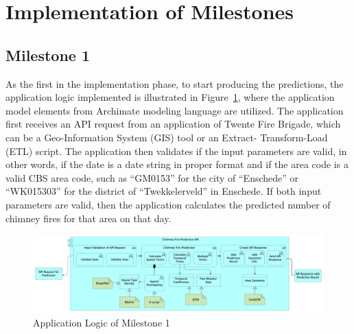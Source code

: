 \documentclass{utitcphd_overleaf}
\begin{document}






\section{Implementation of Milestones}

\subsection{Milestone 1}

As the first in the implementation phase, to start producing the predictions, the application logic implemented is illustrated in Figure~\ref{fig:m1_logic}, where the application model elements from Archimate modeling language are utilized. The application first receives an API request from an application of Twente Fire Brigade, which can be a Geo-Information System (GIS) tool or an Extract- Transform-Load (ETL) script. The application then validates if the input parameters are valid, in other words, if the date is a date string in proper format and if the area code is a valid CBS area code, such as “GM0153” for the city of “Enschede” or “WK015303” for the district of “Twekkelerveld” in Enschede. If both input parameters are valid, then the application calculates the predicted number of chimney fires for that area on that day.

\begin{figure}[ht]
  \centering
  \includegraphics[width=1\textwidth]{my_images/milestones/m1.png}
  \caption{Application Logic of Milestone 1}
  \label{fig:m1_logic}
\end{figure}
\end{document}
